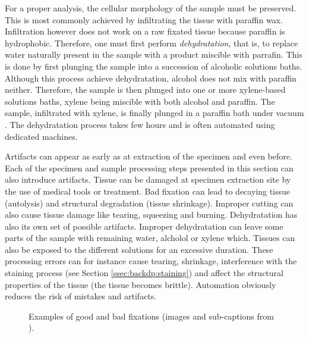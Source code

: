 For a proper analysis, the cellular morphology of the sample must be preserved. This is most commonly achieved by infiltrating the tissue with paraffin wax. Infiltration however does not work on a raw fixated tissue because paraffin is hydrophobic. Therefore, one must first perform \textit{dehydratation}, that is, to replace water naturally present in the sample with a product miscible with parrafin. This is done by first plunging the sample into a succession of alcoholic solutions baths. Although this process achieve dehydratation, alcohol does not mix with paraffin neither. Therefore, the sample is then plunged into one or more xylene-based solutions baths, xylene being miscible with both alcohol and paraffin. The sample, infiltrated with xylene, is finally plunged in a paraffin bath under vacuum . The dehydratation process takes few hours and is often automated using dedicated machines.  

Artifacts can appear as early as at extraction of the specimen and even before. Each of the specimen and sample processing steps presented in this section can also introduce artifacts. Tissue can be damaged at specimen extraction site by the use of medical tools or treatment. Bad fixation can lead to decaying tissue (\ie autolysis) and structural degradation (\eg tissue shrinkage). Improper cutting can also cause tissue damage like tearing, squeezing and burning. Dehydratation has also its own set of possible artifacts. Improper dehydratation can leave some parts of the sample with remaining water, alcholol or xylene which. Tissues can also be exposed to the different solutions for an excessive duration. These processing errors can for instance cause tearing, shrinkage, interference with the staining process (see Section \ref{ssec:backdp:staining}) and affect the structural properties of the tissue (\eg the tissue becomes brittle). Automation obviously reduces the risk of mistakes and artifacts.


\begin{figure}
  \centering
  \quad
  
    
  \caption{Examples of good and bad fixations (images and sub-captions from \parencite{rolls2012process}).}
  \label{fig:backdp:fixation}
\end{figure}

